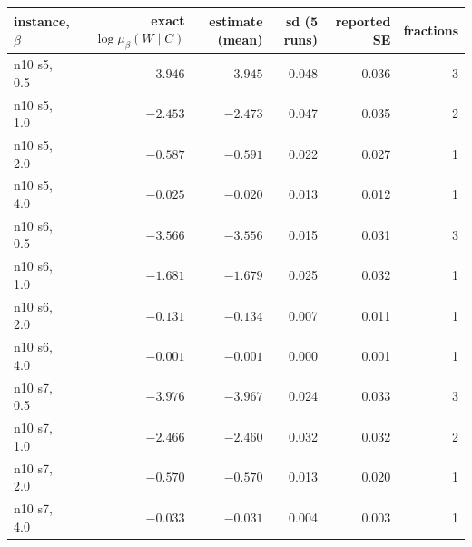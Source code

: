 \begin{tabular}{lrrrrr}
\toprule
instance, $\beta$ & exact $\log\mu_\beta(W\mid C)$ & estimate (mean) & sd (5 runs) & reported SE & fractions \\
\midrule
n10 s5, 0.5 & $-3.946$ & $-3.945$ & 0.048 & 0.036 & 3 \\
n10 s5, 1.0 & $-2.453$ & $-2.473$ & 0.047 & 0.035 & 2 \\
n10 s5, 2.0 & $-0.587$ & $-0.591$ & 0.022 & 0.027 & 1 \\
n10 s5, 4.0 & $-0.025$ & $-0.020$ & 0.013 & 0.012 & 1 \\
n10 s6, 0.5 & $-3.566$ & $-3.556$ & 0.015 & 0.031 & 3 \\
n10 s6, 1.0 & $-1.681$ & $-1.679$ & 0.025 & 0.032 & 1 \\
n10 s6, 2.0 & $-0.131$ & $-0.134$ & 0.007 & 0.011 & 1 \\
n10 s6, 4.0 & $-0.001$ & $-0.001$ & 0.000 & 0.001 & 1 \\
n10 s7, 0.5 & $-3.976$ & $-3.967$ & 0.024 & 0.033 & 3 \\
n10 s7, 1.0 & $-2.466$ & $-2.460$ & 0.032 & 0.032 & 2 \\
n10 s7, 2.0 & $-0.570$ & $-0.570$ & 0.013 & 0.020 & 1 \\
n10 s7, 4.0 & $-0.033$ & $-0.031$ & 0.004 & 0.003 & 1 \\
\bottomrule
\end{tabular}
